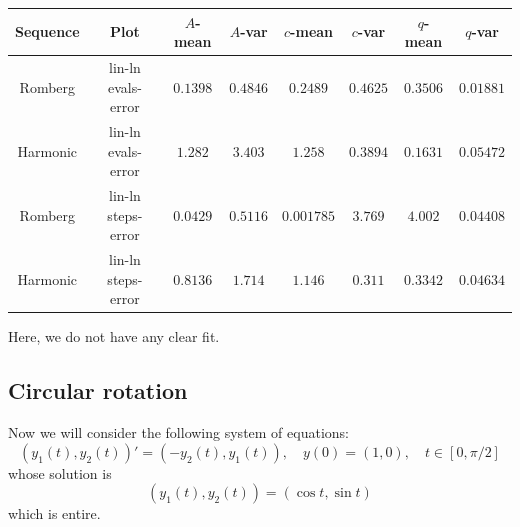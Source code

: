 \begin{table}[H]
    \centering
    \small
     \begin{tabular}{c|c||c|c|c|c|c|c}
Sequence & Plot & \(A\)-mean & \(A\)-var & \(c\)-mean & \(c\)-var & \(q\)-mean & \(q\)-var\\\hline
\rowcolor{red}
Romberg & lin-ln evals-error & \(0.1398\) & \(0.4846\) & \(0.2489\) & \(0.4625\) & \(0.3506\) & \(0.01881\) \\
\rowcolor{red}
Harmonic & lin-ln evals-error & \(1.282\) & \(3.403\) & \(1.258\) & \(0.3894\) & \(0.1631\) & \(0.05472\) \\
\rowcolor{red}
Romberg & lin-ln steps-error & \(0.0429\) & \(0.5116\) & \(0.001785\) & \(3.769\) & \(4.002\) & \(0.04408\) \\
\rowcolor{red}
Harmonic & lin-ln steps-error & \(0.8136\) & \(1.714\) & \(1.146\) & \(0.311\) & \(0.3342\) & \(0.04634\) \\
    \end{tabular}
    \label{tab:my_label}
\end{table}

Here, we do not have any clear fit.

\subsection{Circular rotation}

Now we will consider the following system of equations:
\begin{equation}\label{48}
(y_1(t),y_2(t))' = (-y_2(t), y_1(t)), \quad y(0) = (1,0), \quad t\in [0,\pi /2]
\end{equation}
whose solution is 
\[
(y_1(t),y_2(t)) = (\cos t, \sin t)
\]
which is entire.

